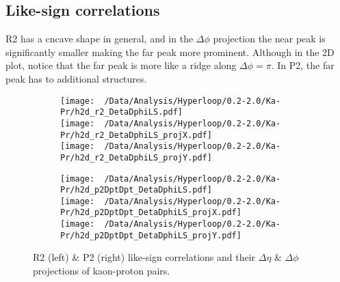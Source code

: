\documentclass[12pt,a4paper,twoside]{report}
\begin{document}
\subsection{Like-sign correlations}
R2 has a cncave shape in general, and in the $\Delta\phi$ projection the near peak is significantly smaller making the far peak more prominent. Although in the 2D plot, notice that the far peak is more like a ridge along $\Delta\phi=\pi$. In P2, the far peak has to additional structures.
\begin{figure}[H]
	\begin{subfigure}{0.49\linewidth}
		\texttt{[image: ~/Data/Analysis/Hyperloop/0.2-2.0/Ka-Pr/h2d\_r2\_DetaDphiLS.pdf]}\\
		\texttt{[image: ~/Data/Analysis/Hyperloop/0.2-2.0/Ka-Pr/h2d\_r2\_DetaDphiLS\_projX.pdf]}\\
		\texttt{[image: ~/Data/Analysis/Hyperloop/0.2-2.0/Ka-Pr/h2d\_r2\_DetaDphiLS\_projY.pdf]}\\
	\end{subfigure}
	\begin{subfigure}{0.49\linewidth}
		\texttt{[image: ~/Data/Analysis/Hyperloop/0.2-2.0/Ka-Pr/h2d\_p2DptDpt\_DetaDphiLS.pdf]}\\
		\texttt{[image: ~/Data/Analysis/Hyperloop/0.2-2.0/Ka-Pr/h2d\_p2DptDpt\_DetaDphiLS\_projX.pdf]}\\
		\texttt{[image: ~/Data/Analysis/Hyperloop/0.2-2.0/Ka-Pr/h2d\_p2DptDpt\_DetaDphiLS\_projY.pdf]}\\
	\end{subfigure}
	\caption{R2 (left) \& P2 (right) like-sign correlations and their $\Delta\eta$ \& $\Delta\phi$ projections of kaon-proton pairs.}
\end{figure}
\end{document}
